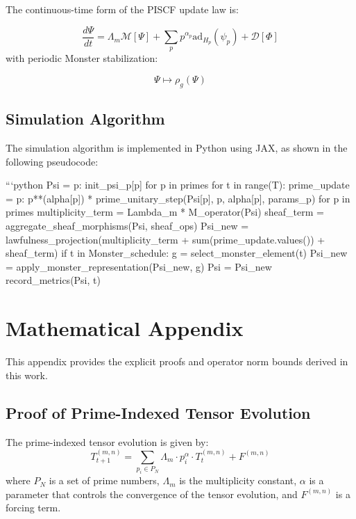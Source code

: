 \documentclass{article}
\theoremstyle{plain}
\begin{document}
The continuous-time form of the PISCF update law is:

$$

\frac{d\Psi}{dt} = \Lambda_m \mathcal{M}[\Psi] + \sum_{p} p^{\alpha_p} \mathrm{ad}_{H_p}(\psi_p) + \mathcal{D}[\Phi]

$$
with periodic Monster stabilization:

$$

\Psi \mapsto \rho_g(\Psi)

$$

\subsection{Simulation Algorithm}

The simulation algorithm is implemented in Python using JAX, as shown in the following pseudocode:

```python
Psi = {p: init_psi_p[p] for p in primes}
for t in range(T):
    prime_update = {p: p**(alpha[p]) * prime_unitary_step(Psi[p], p, alpha[p], params_p) for p in primes}
    multiplicity_term = Lambda_m * M_operator(Psi)
    sheaf_term = aggregate_sheaf_morphisms(Psi, sheaf_ops)
    Psi_new = lawfulness_projection(multiplicity_term + sum(prime_update.values()) + sheaf_term)
    if t in Monster_schedule:
        g = select_monster_element(t)
        Psi_new = apply_monster_representation(Psi_new, g)
    Psi = Psi_new
    record_metrics(Psi, t)

    \section{Mathematical Appendix}

This appendix provides the explicit proofs and operator norm bounds derived in this work.

\subsection{Proof of Prime-Indexed Tensor Evolution}

The prime-indexed tensor evolution is given by:
\begin{equation}
T_{t+1}^{(m,n)} = \sum_{p_i \in P_N} \Lambda_m \cdot p_i^\alpha \cdot T_t^{(m,n)} + F^{(m,n)}
\end{equation}
where $P_N$ is a set of prime numbers, $\Lambda_m$ is the multiplicity constant, $\alpha$ is a parameter that controls the convergence of the tensor evolution, and $F^{(m,n)}$ is a forcing term.
\end{document}
